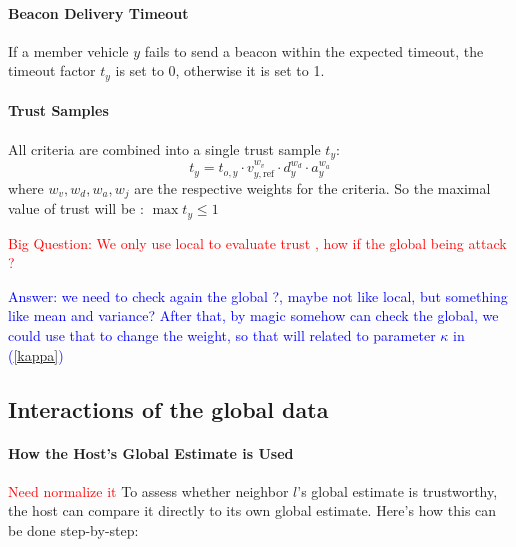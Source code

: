 \documentclass[letterpaper, 10pt, conference]{ieeeconf}  %
\def\eqref#1{(\ref{#1})}
\begin{document}
\paragraph{Beacon Delivery Timeout} If a member vehicle $y$ fails to send a beacon within the expected timeout, the timeout factor $t_y$ is set to 0, otherwise it is set to 1.

\paragraph{Trust Samples}

All criteria are combined into a single trust sample $t_y$:
\begin{equation}
    t_y = t_{o,y} \cdot v^{w_v}_{y,\text{ref}} \cdot d^{w_d}_y \cdot a^{w_a}_y 
\end{equation}
where $w_v, w_d, w_a, w_j$ are the respective weights for the criteria. So the maximal value of trust will be : 
$\max{t_y} \leq 1$


\textcolor{red}{Big Question: We only use local to evaluate trust , how if the global being attack ? }

\textcolor{blue}{Answer: we need to check again the global ?, maybe not like local, but something like mean and variance? After that, by magic somehow can check the global, we could use that to change the weight, so that will related to parameter $\kappa$ in \eqref{kappa} }


\subsection{Interactions of the global data}


\paragraph{How the Host's Global Estimate is Used}

\textcolor{red}{Need normalize it}
To assess whether neighbor \( l \)'s global estimate is trustworthy, the host can compare it directly to its own global estimate. Here's how this can be done step-by-step:
\end{document}
